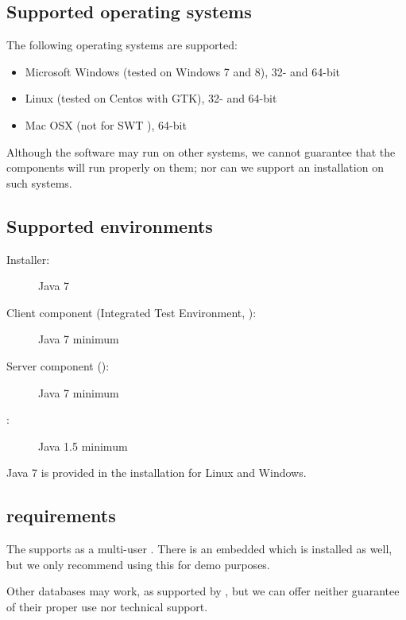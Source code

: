 
\subsection{Supported operating systems}
The following operating systems are supported:
\begin{itemize}
  \item Microsoft Windows (tested on Windows 7 and 8), 32- and 64-bit
  \item  Linux (tested on Centos with GTK), 32- and 64-bit
  \item Mac OSX (not for SWT \gdauts{}), 64-bit 

\end{itemize}

Although the software may run on other systems, we cannot guarantee that the components will run properly on them; nor can we support an installation on such systems.

\subsection{Supported  environments}
\begin{description}
\item [Installer:]{Java 7}
\item [Client component (Integrated Test Environment, \ite{}):]{Java 7 minimum}
\item [Server component (\gdagent):]{Java 7 minimum}
\item [\gdaut{}:]{Java 1.5 minimum}
\end{description}
Java 7 is provided in the  installation for Linux and Windows.

 

\subsection{\gdDB requirements}
The \ite{} supports   as a multi-user \gddb{}. There is an embedded \gddb{} which is installed as well, but we only recommend using this for demo purposes. 

Other databases may work, as supported by , but we can offer neither guarantee of their proper use nor technical support. 


